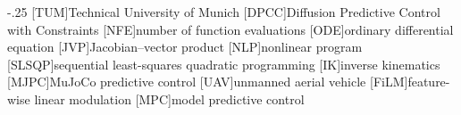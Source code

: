 
\begin{acronym}
  \itemsep-.25\baselineskip
  [TUM]{Technical University of Munich}
  [DPCC]{Diffusion Predictive Control with Constraints}
  [NFE]{number of function evaluations}
  [ODE]{ordinary differential equation}
  [JVP]{Jacobian--vector product}
  [NLP]{nonlinear program}
  [SLSQP]{sequential least-squares quadratic programming}
  [IK]{inverse kinematics}
  [MJPC]{MuJoCo predictive control}
  [UAV]{unmanned aerial vehicle}
  [FiLM]{feature-wise linear modulation}
  [MPC]{model predictive control}
\end{acronym}

\listoffigures{}
\listoftables{}

\printbibliography{}

